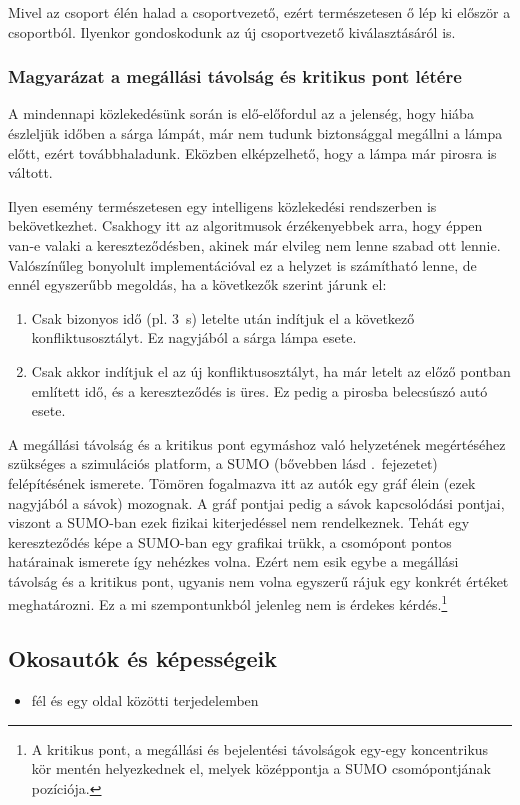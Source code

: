 \documentclass{report}
\begin{document}
					Mivel az csoport élén halad a csoportvezető, ezért természetesen ő lép ki először a csoportból. Ilyenkor gondoskodunk az új csoportvezető kiválasztásáról is.
					
				\subsubsection{Magyarázat a megállási távolság és kritikus pont létére}
					A mindennapi közlekedésünk során is elő-előfordul az a jelenség, hogy hiába észleljük időben a sárga lámpát, már nem tudunk biztonsággal megállni a lámpa előtt, ezért továbbhaladunk. Eközben elképzelhető, hogy a lámpa már pirosra is váltott.
					
					Ilyen esemény természetesen egy intelligens közlekedési rendszerben is bekövetkezhet. Csakhogy itt az algoritmusok érzékenyebbek arra, hogy éppen van-e valaki a kereszteződésben, akinek már elvileg nem lenne szabad ott lennie. Valószínűleg bonyolult implementációval ez a helyzet is számítható lenne, de ennél egyszerűbb megoldás, ha a következők szerint járunk el:
					\begin{enumerate}
						\item Csak bizonyos idő (pl. 3~s) letelte után indítjuk el a következő konfliktusosztályt. Ez nagyjából a sárga lámpa esete.
						\item Csak akkor indítjuk el az új konfliktusosztályt, ha már letelt az előző pontban említett idő, és a kereszteződés is üres. Ez pedig a pirosba belecsúszó autó esete.
					\end{enumerate}
					
					A megállási távolság és a kritikus pont egymáshoz való helyzetének megértéséhez szükséges a szimulációs platform, a SUMO (bővebben lásd .~fejezetet) felépítésének ismerete. Tömören fogalmazva itt az autók egy gráf élein (ezek nagyjából a sávok) mozognak. A gráf pontjai pedig a sávok kapcsolódási pontjai, viszont a SUMO-ban ezek fizikai kiterjedéssel nem rendelkeznek. Tehát egy kereszteződés képe a SUMO-ban egy grafikai trükk, a csomópont pontos határainak ismerete így nehézkes volna. Ezért nem esik egybe a megállási távolság és a kritikus pont, ugyanis nem volna egyszerű rájuk egy konkrét értéket meghatározni. Ez a mi szempontunkból jelenleg nem is érdekes kérdés.\footnote{A kritikus pont, a megállási és bejelentési távolságok egy-egy koncentrikus kör mentén helyezkednek el, melyek középpontja a SUMO csomópontjának pozíciója.}
					
			\subsection{Okosautók és képességeik}
				\begin{itemize}
					\item fél és egy oldal közötti terjedelemben
				\end{itemize}
\end{document}

